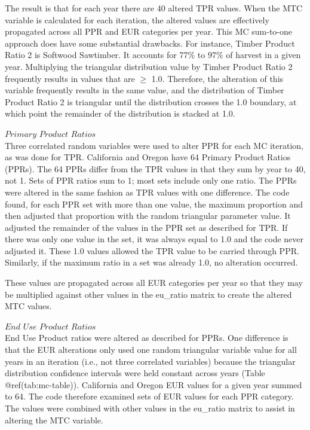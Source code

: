 \documentclass[
  openany]{book}
\begin{document}
The result is that for each year there are 40 altered TPR values. When
the MTC variable is calculated for each iteration, the altered values
are effectively propagated across all PPR and EUR categories per year.
This MC sum-to-one approach does have some substantial drawbacks. For
instance, Timber Product Ratio 2 is Softwood Sawtimber. It accounts for
77\% to 97\% of harvest in a given year. Multiplying the triangular
distribution value by Timber Product Ratio 2 frequently results in
values that are \(\geq\) 1.0. Therefore, the alteration of this variable
frequently results in the same value, and the distribution of Timber
Product Ratio 2 is triangular until the distribution crosses the 1.0
boundary, at which point the remainder of the distribution is stacked at
1.0.

\(\textit{Primary Product Ratios}\)\\
Three correlated random variables were used to alter PPR for each MC
iteration, as was done for TPR. California and Oregon have 64 Primary
Product Ratios (PPRs). The 64 PPRs differ from the TPR values in that
they sum by year to 40, not 1. Sets of PPR ratios sum to 1; most sets
include only one ratio. The PPRs were altered in the same fashion as TPR
values with one difference. The code found, for each PPR set with more
than one value, the maximum proportion and then adjusted that proportion
with the random triangular parameter value. It adjusted the remainder of
the values in the PPR set as described for TPR. If there was only one
value in the set, it was always equal to 1.0 and the code never adjusted
it. These 1.0 values allowed the TPR value to be carried through PPR.
Similarly, if the maximum ratio in a set was already 1.0, no alteration
occurred.

These values are propagated across all EUR categories per year so that
they may be multiplied against other values in the eu\_ratio matrix to
create the altered MTC values.

\(\textit{End Use Product Ratios}\)\\
End Use Product ratios were altered as described for PPRs. One
difference is that the EUR alterations only used one random triangular
variable value for all years in an iteration (i.e., not three correlated
variables) because the triangular distribution confidence intervals were
held constant across years (Table @ref(tab:mc-table)). California and
Oregon EUR values for a given year summed to 64. The code therefore
examined sets of EUR values for each PPR category. The values were
combined with other values in the eu\_ratio matrix to assist in altering
the MTC variable.
\end{document}

